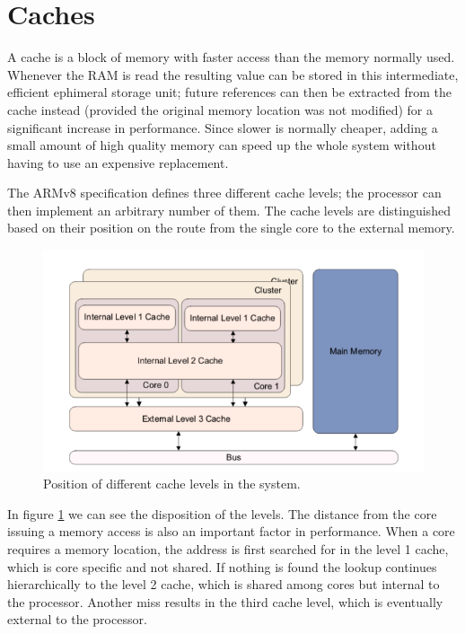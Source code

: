 \documentclass[12pt,a4paper,openright,twoside]{report}
\begin{document}
\section{Caches}
\label{cache}
A cache is a block of memory with faster access than the memory normally used.
Whenever the RAM is read the resulting value can be stored in this intermediate,
efficient ephimeral storage unit; future references can then be extracted from 
the cache instead (provided the original memory location was not modified) for
a significant increase in performance.
Since slower is normally cheaper, adding a small amount of high quality memory can
speed up the whole system without having to use an expensive replacement.

The ARMv8 specification defines three different cache levels; the processor can
then implement an arbitrary number of them. The cache levels are distinguished 
based on their position on the route from the single core to the external memory.

 \begin{figure}[t]
 \includegraphics[scale=0.6]{images/tesi12.png} 
 \caption[Cache Levels]{Position of different cache levels in the system.}\label{fig:cache}
 \end{figure}

 In figure \ref{fig:cache} we can see the disposition of the levels. The distance
 from the core issuing a memory access is also an important factor in performance.
When a core requires a memory location, the address is first searched for in 
the level 1 cache, which is core specific and not shared. If nothing is found 
the lookup continues hierarchically to the level 2 cache, which is shared among
cores but internal to the processor. Another miss results in the third cache level,
which is eventually external to the processor.
\end{document}
